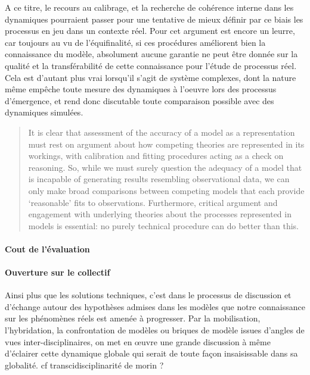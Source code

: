 A ce titre, le recours au calibrage, et la recherche de cohérence interne dans les dynamiques pourraient passer pour une tentative de mieux définir par ce biais les processus en jeu dans un contexte réel. Pour \autocite{OSullivan2004} cet argument est encore un leurre, car toujours au vu de l'équifinalité, si ces procédures améliorent bien la connaissance du modèle, absolument aucune garantie ne peut être donnée sur la qualité et la transférabilité de cette connaissance pour l'étude de processus réel. Cela est d'autant plus vrai lorsqu'il s'agit de système complexes, dont la nature même empêche toute  mesure des dynamiques à l'oeuvre lors des processus d'émergence, et rend donc discutable toute comparaison possible avec des dynamiques simulées. 

\begin{quotation} It is clear that assessment of the accuracy of a model as a representation must rest on argument about how competing theories are represented in its workings, with calibration and fitting procedures acting as a check on reasoning. So, while we must surely question the adequacy of a model that is incapable of generating results resembling observational data, we can only make broad comparisons between competing models that each provide ‘reasonable’ fits to observations. Furthermore, critical argument and engagement with underlying theories about the processes represented in models is essential: no purely technical procedure can do better than this.  \\  \end{quotation}



\paragraph{Cout de l'évaluation}


\paragraph{Ouverture sur le collectif}

Ainsi plus que les solutions techniques, c'est dans le processus de discussion et d'échange autour des hypothèses admises dans les modèles que notre connaissance sur les phénomènes réels est amenée à progresser. Par la mobilisation, l'hybridation, la confrontation de modèles ou briques de modèle issues d'angles de vues inter-disciplinaires,  on met en œuvre une grande discussion à même d'éclairer cette dynamique globale qui serait de toute façon insaisissable dans sa globalité. {cf transcidisciplinarité de morin ?}

